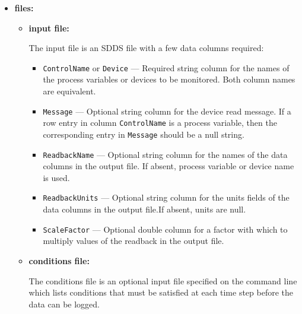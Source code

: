 \begin{itemize}
\begin{verbatim}
    [-glitch=<controlname>[,message=<string>]{,delta=<value>|,fraction=<value>}\
[,before=<number>][,after=<number>][,baseline=<number>][,holdoff=<seconds>]] 
    [-trigger=<controlName>,level=<value>[,message=<string>][,slope={+ | -}]\
[,before=<number>][,after=<number>][,holdoff=<seconds>][,autoArm]]
    [-conditions=<filename>,{allMustPass | oneMustPass}[,touchOutput][,retakeStep]]
    [-noezca] [-comment=<parameterName>,<text>]
    [-getUnits={force | ifBlank | ifNoneGiven}]\n\
Writes values of process variables or devices to a binary SDDS file.
\end{verbatim}
\item {\bf files:}
\begin{itemize}
\item {\bf input file:}\par
The input file is an SDDS file with a few data columns required:
\begin{itemize}
        \item {\tt ControlName} or {\tt Device} --- Required string column for the names of the process variables
                or devices to be monitored. Both column names are equivalent.
        \item {\tt Message} --- Optional string column for the device read message. If a row entry in
                column {\tt ControlName} is a process variable, then the corresponding entry
                in {\tt Message} should be a null string. 
        \item {\tt ReadbackName} --- Optional string column for the names of the data columns in the 
                output file. If absent, process variable or device name is used.
        \item {\tt ReadbackUnits} --- Optional string column for the units fields of the data columns in the 
                output file.If absent, units are null.
        \item {\tt ScaleFactor} --- Optional double column for a factor with which to multiply
                values of the readback in the output file.
\end{itemize}

\item {\bf conditions file:} \par
The conditions file is an optional input file specified on the command line which lists
conditions that must be satisfied at each time step before the data can be logged.


\end{itemize}
\end{itemize}
